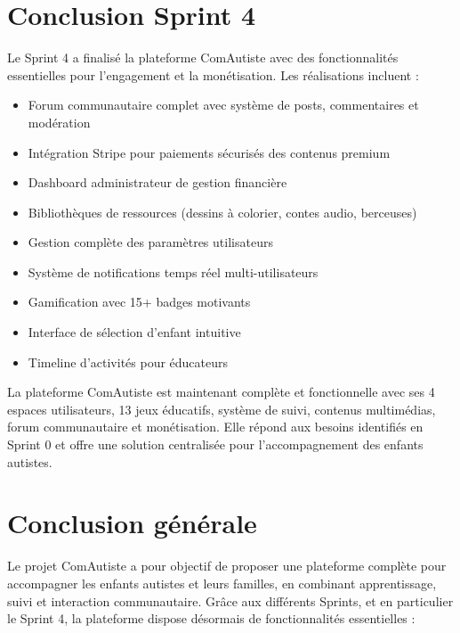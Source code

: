 \documentclass[12pt,a4paper]{report}
\begin{document}
\section*{Conclusion Sprint 4}
Le Sprint 4 a finalisé la plateforme ComAutiste avec des fonctionnalités essentielles pour l'engagement et la monétisation. Les réalisations incluent :
\begin{itemize}
\item Forum communautaire complet avec système de posts, commentaires et modération
\item Intégration Stripe pour paiements sécurisés des contenus premium
\item Dashboard administrateur de gestion financière
\item Bibliothèques de ressources (dessins à colorier, contes audio, berceuses)
\item Gestion complète des paramètres utilisateurs
\item Système de notifications temps réel multi-utilisateurs
\item Gamification avec 15+ badges motivants
\item Interface de sélection d'enfant intuitive
\item Timeline d'activités pour éducateurs
\end{itemize}
La plateforme ComAutiste est maintenant complète et fonctionnelle avec ses 4 espaces utilisateurs, 13 jeux éducatifs, système de suivi, contenus multimédias, forum communautaire et monétisation. Elle répond aux besoins identifiés en Sprint 0 et offre une solution centralisée pour l'accompagnement des enfants autistes.

\newpage


\section*{Conclusion générale}

Le projet ComAutiste a pour objectif de proposer une plateforme complète pour accompagner les enfants autistes et leurs familles, en combinant apprentissage, suivi et interaction communautaire. Grâce aux différents Sprints, et en particulier le Sprint 4, la plateforme dispose désormais de fonctionnalités essentielles :
\end{document}
